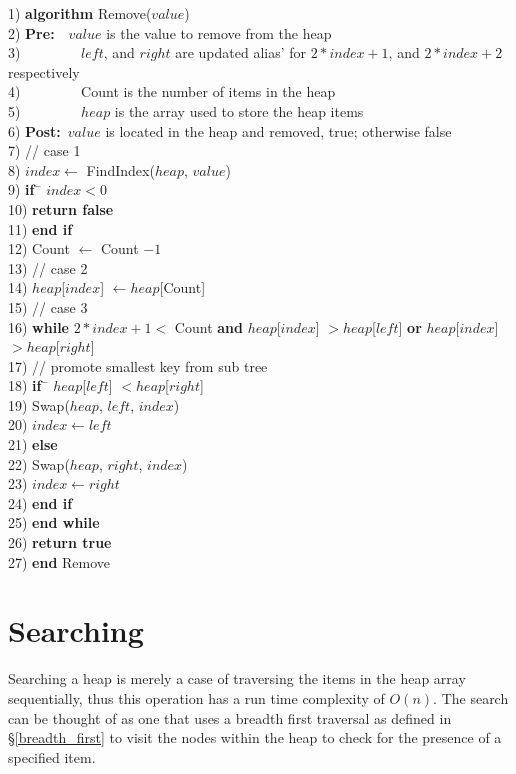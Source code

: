 \newpage
\begin{tabbing}
1)  \textbf{alg}\= \textbf{orithm} Remove($value$) \\
2)  \> \textbf{Pre:}~~$value$ is the value to remove from the heap \\
3)  \> ~~~~~~~~$left$, and $right$ are updated alias' for $2*index+1$, and $2*index+2 $ respectively \\
4)  \> ~~~~~~~~Count is the number of items in the heap \\
5)  \> ~~~~~~~~$heap$ is the array used to store the heap items \\
6)  \> \textbf{Post:}~$value$ is located in the heap and removed, true; otherwise false \\
7)  \> // case 1 \\
8)  \> $index \leftarrow$ FindIndex($heap$, $value$) \\
9)  \> \textbf{if}~\= $index < 0$ \\
10) \> \> \textbf{return false} \\
11) \> \textbf{end if} \\
12) \> Count $\leftarrow$ Count $ - 1$ \\
13) \> // case 2 \\
14) \> $heap$[$index$] $\leftarrow heap$[Count] \\
15) \> // case 3 \\
16) \> \textbf{while} $2 * index + 1 <$ Count \textbf{and} $heap$[$index$] $> heap$[$left$] \textbf{or} $heap$[$index$] $> heap$[$right$] \\
17) \> \> // promote smallest key from sub tree \\
18) \> \> \textbf{if}~\= $heap$[$left$] $< heap$[$right$] \\
19) \> \> \> Swap($heap$, $left$, $index$) \\
20) \> \> \> $index \leftarrow left$ \\
21) \> \> \textbf{else} \\
22) \> \> \> Swap($heap$, $right$, $index$) \\
23) \> \> \> $index \leftarrow right$ \\
24) \> \> \textbf{end if} \\
25) \> \textbf{end while} \\
26) \> \textbf{return true} \\
27) \textbf{end} Remove \\
\end{tabbing} 

\section{Searching} \label{heap_searching}
Searching a heap is merely a case of traversing the items in the heap array sequentially, thus this operation has a run time complexity of $O(n)$. The search can be thought of as one that uses a breadth first traversal as defined in \S\ref{breadth_first} to visit the nodes within the heap to check for the presence of a specified item.

